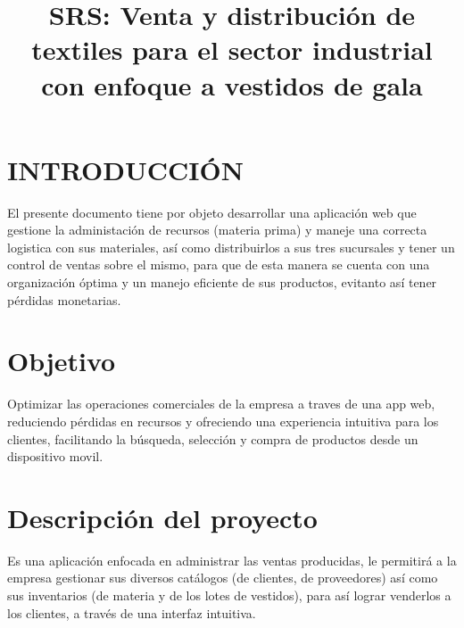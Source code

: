 \documentclass[conference]{IEEEtran}
\begin{document}
\title{SRS: Venta y distribución de textiles para el sector industrial con enfoque a vestidos de gala}

\author{

}

\maketitle

\section{INTRODUCCIÓN}

El presente documento tiene por objeto desarrollar una aplicación web que gestione la administación de recursos (materia prima) y maneje una correcta logistica con sus materiales, así como distribuirlos a sus tres sucursales y tener un control de ventas sobre el mismo, para que de esta manera se cuenta con una organización óptima y un manejo eficiente de sus productos, evitanto así tener pérdidas monetarias.

\section{Objetivo}

Optimizar las operaciones comerciales de la empresa a traves de una app web, reduciendo pérdidas en recursos y ofreciendo una experiencia intuitiva para los clientes, facilitando la búsqueda, selección y compra de productos desde un dispositivo movil. 
		
\section{Descripción del proyecto}
Es una aplicación enfocada en administrar las ventas
producidas, le permitirá a la empresa gestionar sus diversos catálogos (de clientes,
de proveedores) así como sus inventarios (de materia y de los lotes de vestidos),
para así lograr venderlos a los clientes, a través de una interfaz intuitiva. \linebreak  
\end{document}
